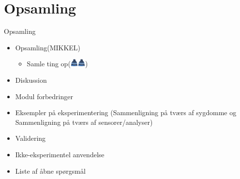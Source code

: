 \section{Opsamling}
\begin{frame}{Opsamling}
\newcommand{\hue}{\includegraphics[width=0.4cm]{hue}}
\begin{itemize}
\item Opsamling(MIKKEL)
\begin{itemize}
\item Samle ting op(\hue{}\hue{})
\end{itemize}
\item Diskussion
\item Modul forbedringer
\item Eksempler på eksperimentering (Sammenligning på tværs af sygdomme og Sammenligning på tværs af sensorer/analyser)
\item Validering
\item Ikke-eksperimentel anvendelse
\item Liste af åbne spørgsmål
\end{itemize}
\end{frame}
